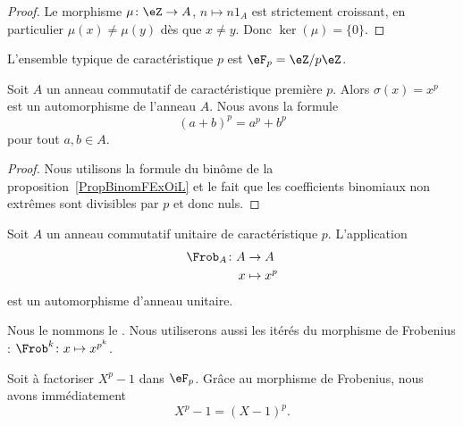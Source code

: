 \begin{proof}
    Le morphisme \( \mu\colon \eZ\to A\), \( n\mapsto n 1_A\) est strictement croissant, en particulier \( \mu(x)\neq \mu(y)\) dès que \( x\neq y\). Donc \( \ker(\mu)=\{ 0 \}\).
\end{proof}

L'ensemble typique de caractéristique \( p\) est \( \eF_p=\eZ/p\eZ\).



\begin{proposition}     \label{Propqrrdem}
    Soit \( A\) un anneau commutatif de caractéristique première \( p\). Alors \( \sigma(x)=x^p\) est un automorphisme de l'anneau \( A\). Nous avons la formule
    \begin{equation}
        (a+b)^p=a^p+b^p
    \end{equation}
    pour tout \( a,b\in A\).
\end{proposition}

\begin{proof}
    Nous utilisons la formule du binôme de la proposition~\ref{PropBinomFExOiL} et le fait que les coefficients binomiaux non extrêmes sont divisibles par \( p\) et donc nuls.
\end{proof}

\begin{proposition} \label{PropFrobHAMkTY}
    Soit \( A\) un anneau commutatif unitaire de caractéristique \( p\). L'application
    \begin{equation}
        \begin{aligned}
            \Frob_A\colon A&\to A \\
            x&\mapsto x^p
        \end{aligned}
    \end{equation}
    est un automorphisme d'anneau unitaire.
\end{proposition}
Nous le nommons le . Nous utiliserons aussi les itérés du morphisme de Frobenius : \( \Frob^k\colon x\mapsto x^{p^k}\).

\begin{example}
    Soit à factoriser \( X^p-1\) dans \( \eF_p\). Grâce au morphisme de Frobenius, nous avons immédiatement
    \begin{equation}
        X^p-1=(X-1)^p.
    \end{equation}
\end{example}

